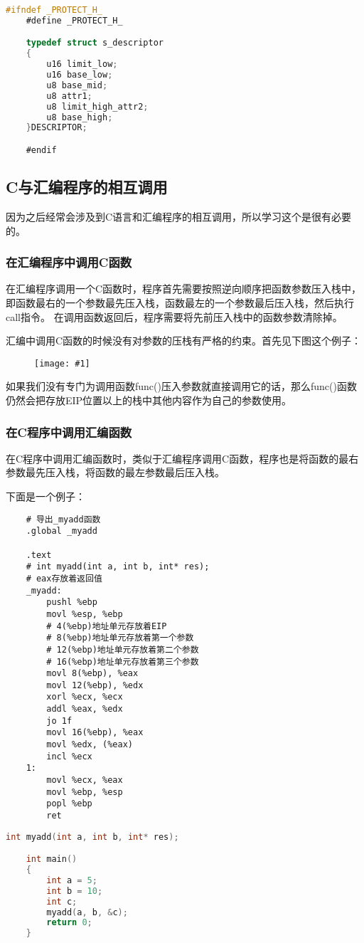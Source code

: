 \documentclass[a4paper,left=2.5cm,right=2.5cm,11pt]{article}
\newcommand{\fic}[1]{\begin{figure}[H]
		\center
		\texttt{[image: \#1]}
	\end{figure}}
\begin{document}
	\begin{lstlisting}[language = C]
	#ifndef _PROTECT_H_
	#define _PROTECT_H_

	typedef struct s_descriptor
	{
		u16 limit_low;
		u16 base_low;
		u8 base_mid;
		u8 attr1;
		u8 limit_high_attr2;
		u8 base_high;
	}DESCRIPTOR;

	#endif
	\end{lstlisting}

\subsection{C与汇编程序的相互调用}
	因为之后经常会涉及到C语言和汇编程序的相互调用，所以学习这个是很有必要的。
\subsubsection{在汇编程序中调用C函数}
	在汇编程序调用一个C函数时，程序首先需要按照逆向顺序把函数参数压入栈中，即函数最右的一个参数最先压入栈，函数最左的一个参数最后压入栈，然后执行call指令。
	在调用函数返回后，程序需要将先前压入栈中的函数参数清除掉。\par
	汇编中调用C函数的时候没有对参数的压栈有严格的约束。首先见下图这个例子：
	\fic{3.png}

	如果我们没有专门为调用函数func()压入参数就直接调用它的话，那么func()函数仍然会把存放EIP位置以上的栈中其他内容作为自己的参数使用。
\subsubsection{在C程序中调用汇编函数}
	在C程序中调用汇编函数时，类似于汇编程序调用C函数，程序也是将函数的最右参数最先压入栈，将函数的最左参数最后压入栈。\par
	下面是一个例子：
	\begin{lstlisting}
	# 导出_myadd函数
	.global _myadd

	.text
	# int myadd(int a, int b, int* res);
	# eax存放着返回值
	_myadd:
		pushl %ebp
		movl %esp, %ebp
		# 4(%ebp)地址单元存放着EIP
		# 8(%ebp)地址单元存放着第一个参数
		# 12(%ebp)地址单元存放着第二个参数
		# 16(%ebp)地址单元存放着第三个参数
		movl 8(%ebp), %eax
		movl 12(%ebp), %edx
		xorl %ecx, %ecx
		addl %eax, %edx
		jo 1f
		movl 16(%ebp), %eax
		movl %edx, (%eax)
		incl %ecx
	1:
		movl %ecx, %eax
		movl %ebp, %esp
		popl %ebp
		ret
	\end{lstlisting}

	\begin{lstlisting}[language = C]
	int myadd(int a, int b, int* res);

	int main()
	{
		int a = 5;
		int b = 10;
		int c;
		myadd(a, b, &c);
		return 0;
	}
	\end{lstlisting}
\end{document}
